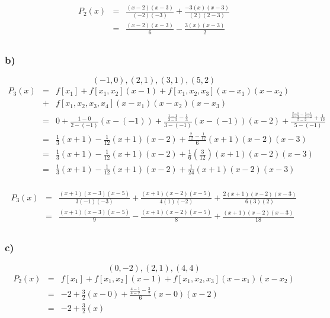 \documentclass[12pt]{article}
\begin{document}
\begin{eqnarray*}
  P_2(x) & = & \frac{(x-2)(x-3)}{(-2)(-3)} + \frac{-3(x)(x-3)}{(2)(2-3)}\\
  & = & \frac{(x-2)(x-3)}{6} - \frac{3(x)(x-3)}{2}\\
\end{eqnarray*}
\subsubsection*{b)}
\[(-1,0), (2,1), (3,1), (5,2)\]
\begin{eqnarray*}
  P_3(x) & = & f[x_1] + f[x_1, x_2](x-1) + f[x_1, x_2, x_3](x-x_1)(x-x_2) \\
  & + &f[x_1, x_2, x_3, x_4](x-x_1)(x-x_2)(x-x_3)\\
  & = & 0 + 
  \frac{1-0}{2 - (-1)}(x-(-1)) + 
  \frac{
    \frac{1 - 1}{3 - 2} -
    \frac{1}{3}}{3 - (-1)}(x-(-1))(x-2) + 
  \frac{\frac{\frac{2 - 1}{5-3} - 
      \frac{1 - 1}{3 - 2}}{5-2} +
    \frac{1}{12}}{5-(-1)}\\
  & = & \frac{1}{3}(x+1) - \frac{1}{12}(x+1)(x-2) + \frac{\frac{2}{12} - \frac{1}{12}}{6}(x+1)(x-2)(x-3)\\
  & = & \frac{1}{3}(x+1) - \frac{1}{12}(x+1)(x-2) + \frac{1}{6}(\frac{3}{12})(x+1)(x-2)(x-3)\\
  & = & \frac{1}{3}(x+1) - \frac{1}{12}(x+1)(x-2) + \frac{1}{24}(x+1)(x-2)(x-3)\\
\end{eqnarray*}

\begin{eqnarray*}
  P_3(x) & = & \frac{(x+1)(x-3)(x-5)}{3(-1)(-3)} + \frac{(x+1)(x-2)(x-5)}{4(1)(-2)} + \frac{2(x+1)(x-2)(x-3)}{6(3)(2)}\\
  & = & \frac{(x+1)(x-3)(x-5)}{9} - \frac{(x+1)(x-2)(x-5)}{8} + \frac{(x+1)(x-2)(x-3)}{18}\\
\end{eqnarray*}
\subsubsection*{c)}
\[(0, -2), (2,1), (4,4)\]
\begin{eqnarray*}
  P_2(x) & = & f[x_1] + f[x_1, x_2](x-1) + f[x_1, x_2, x_3](x-x_1)(x-x_2)\\
  & = & -2 + \frac{3}{2}(x - 0) + \frac{\frac{4-1}{4-2} - \frac{3}{2}}{6}(x-0)(x-2)\\
  & = & -2 + \frac{3}{2}(x)\\
\end{eqnarray*}
\end{document}
